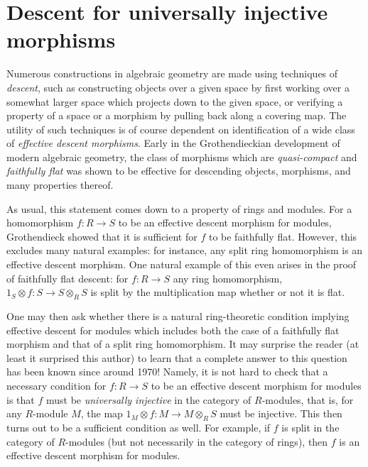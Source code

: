\section{Descent for universally injective morphisms}
\label{section-descent-universally-injective}

\noindent
Numerous constructions in algebraic geometry are made using techniques of 
{\it descent}, such as constructing objects over a given space by first
working over a somewhat larger space which projects down to the given space,
or verifying a property of a space or a morphism by pulling back along a
covering map. The utility of such techniques is of course  dependent on
identification of a wide class of {\it effective descent morphisms}.
Early in the Grothendieckian development of modern algebraic geometry,
the class of morphisms which are {\it quasi-compact} and {\it faithfully flat} 
was shown to be effective for descending objects, morphisms, and many
properties thereof. 

\medskip\noindent
As usual, this statement comes down to a property of rings and modules.
For a homomorphism $f: R \to S$ to be an effective descent morphism for
modules, Grothendieck showed that it is sufficient for $f$ to be
faithfully flat. However, this excludes many natural examples: for instance,
any split ring homomorphism is an effective descent morphism. One natural
example of this even arises in the proof of faithfully flat descent: for
$f: R \to S$ any ring homomorphism, $1_S \otimes f: S \to S \otimes_R S$
is split by the multiplication map whether or not it is flat.

\medskip\noindent
One may then ask whether there is a natural ring-theoretic condition 
implying effective descent for modules which includes both the case of a
faithfully flat morphism and that of a split ring homomorphism. It may
surprise the reader (at least it surprised this author) to learn that a
complete answer to this question has been known since around 1970! Namely,
it is not hard to check that a necessary condition for $f: R \to S$ to be
an effective descent morphism for modules is that $f$ must be
{\it universally injective} in the category of $R$-modules, that is, for
any $R$-module $M$, the map $1_M  \otimes f: M \to M \otimes_R S$
must be injective. This then turns out to be a sufficient condition as well.
For example, if $f$ is split in the category of $R$-modules (but not
necessarily in the category of rings), then $f$ is an effective descent
morphism for modules.
 

